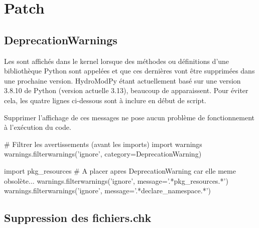 
\chapter{Patch}
\label{chap:patch}

\minitableofcontents

\newpage


\section{DeprecationWarnings}
\label{sec:deprecationwarnings}

Les  sont affichés dans le kernel lorsque des méthodes ou définitions d'une bibliothèque Python sont appelées et que ces dernières vont être supprimées dans une prochaine version. HydroModPy étant actuellement basé sur une version 3.8.10 de Python (version actuelle 3.13), beaucoup de  apparaissent. Pour éviter cela, les quatre lignes ci-dessous sont à inclure en début de script. 

\begin{InfoBox}
    Supprimer l'affichage de ces messages ne pose aucun problème de fonctionnement à l'exécution du code.
\end{InfoBox}

\begin{pythoncode}[]
    # Filtrer les avertissements (avant les imports)
    import warnings
    warnings.filterwarnings('ignore', category=DeprecationWarning)

    import pkg_resources # A placer apres DeprecationWarning car elle meme obsolète...
    warnings.filterwarnings('ignore', message='.*pkg_resources.*')
    warnings.filterwarnings('ignore', message='.*declare_namespace.*')
\end{pythoncode}

\section{Suppression des fichiers.chk}
\label{sec:suppression_fichiers_chk}


